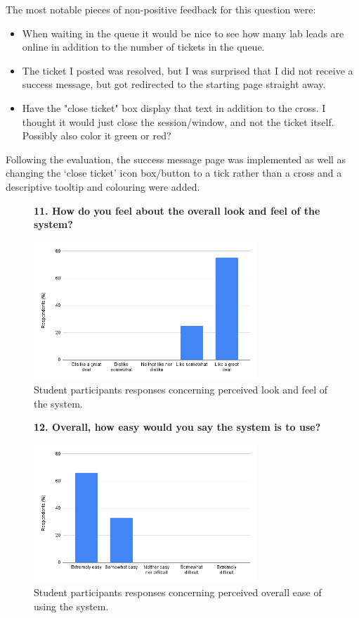 The most notable pieces of non-positive feedback for this question were:

\begin{itemize}
    \item When waiting in the queue it would be nice to see how many lab leads are online in addition to the number of tickets in the queue.
    \item The ticket I posted was resolved, but I was surprised that I did not receive a success message, but got redirected to the starting page straight away.
    \item Have the "close ticket" box display that text in addition to the cross. I thought it would just close the session/window, and not the ticket itself. Possibly also color it green or red?	
\end{itemize}

Following the evaluation, the success message page was implemented as well as changing the `close ticket' icon box/button to a tick rather than a cross and a descriptive tooltip and colouring were added. 

\begin{figure}[H]
    \centering
    \textbf{11. How do you feel about the overall look and feel of the system?}\par\medskip
    \includegraphics[width=0.75\textwidth]{10evaluation/images/stud11.png}
    \caption{Student participants responses concerning perceived look and feel of the system.}
    \label{fig:stud11}
\end{figure}

\begin{figure}[H]
    \centering
    \textbf{12. Overall, how easy would you say the system is to use?}\par\medskip
    \includegraphics[width=0.75\textwidth]{10evaluation/images/stud12.png}
    \caption{Student participants responses concerning perceived overall ease of using the system.}
    \label{fig:stud12}
\end{figure}

